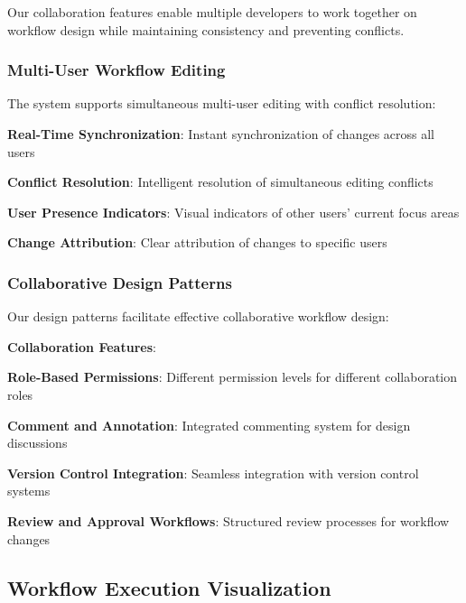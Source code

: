 Our collaboration features enable multiple developers to work together on workflow design while maintaining consistency and preventing conflicts.

\subsubsection*{Multi-User Workflow Editing}

The system supports simultaneous multi-user editing with conflict resolution:

\begin{compactlist}
    \item \textbf{Real-Time Synchronization}: Instant synchronization of changes across all users
    \item \textbf{Conflict Resolution}: Intelligent resolution of simultaneous editing conflicts
    \item \textbf{User Presence Indicators}: Visual indicators of other users' current focus areas
    \item \textbf{Change Attribution}: Clear attribution of changes to specific users
\end{compactlist}

\subsubsection*{Collaborative Design Patterns}

Our design patterns facilitate effective collaborative workflow design:

\begin{alertbox}
\textbf{Collaboration Features}:
\begin{compactlist}
    \item \textbf{Role-Based Permissions}: Different permission levels for different collaboration roles
    \item \textbf{Comment and Annotation}: Integrated commenting system for design discussions
    \item \textbf{Version Control Integration}: Seamless integration with version control systems
    \item \textbf{Review and Approval Workflows}: Structured review processes for workflow changes
\end{compactlist}
\end{alertbox}

\subsection*{Workflow Execution Visualization}


